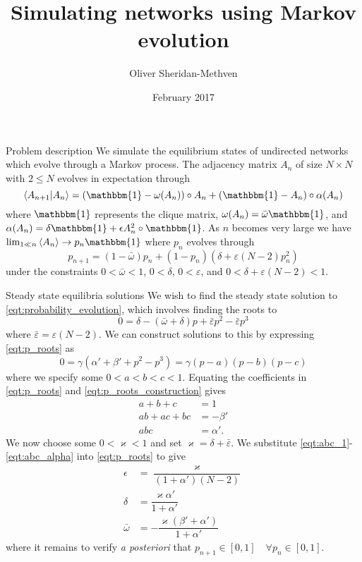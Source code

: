 \documentclass[8pt]{beamer}
\title{Simulating networks using Markov evolution}
\date{February 2017}
\author{Oliver Sheridan-Methven}
\newcommand{\clique}{\mathbbm{1}}
\begin{document}
\maketitle

\begin{frame}{Problem description}
	We simulate the equilibrium states of undirected networks which evolve through a Markov process. The adjacency matrix $ A_n $ of size $ N \times N $  with $ 2 \le N $ evolves in expectation through 
	\begin{equation}
	\bra{A_{n+1}}\ket{A_n} = \left(\clique - \omega(A_n) \right)\circ A_n + (\clique - A_n)\circ \alpha(A_n)
	\end{equation}
	where $ \clique $ represents the clique matrix, $ \omega(A_n) = \bar{\omega} \clique $, and $ \alpha(A_n) = \delta \clique + \epsilon A_n^2 \circ \clique $. As $ n $ becomes very large we have $ \lim_{1 \ll n} \expval{A_n}  \to p_n \clique $ where $ p_n $ evolves through
	\begin{equation}
	\label{eqt:probability_evolution}
	p_{n+1} = (1 - \bar{\omega})p_n + (1-p_n)(\delta + \varepsilon(N-2) p_n^2)
	\end{equation}
	under the constraints $ 0 < \bar{\omega} < 1 $, $ 0 < \delta $, $ 0 < \varepsilon $, and $ 0 < \delta + \varepsilon (N-2) < 1 $.
\end{frame}

\begin{frame}{Steady state equilibria solutions}
	We wish to find the steady state solution to \eqref{eqt:probability_evolution}, which involves finding the roots to 
	\begin{equation}
	\label{eqt:p_roots}
		0 = \delta - (\bar{\omega} + \delta)p + \bar{\varepsilon}p^2 -  \bar{\varepsilon}p^3
	\end{equation}
	where $ \bar{\varepsilon} =\varepsilon(N-2) $. We can construct solutions to this by expressing \eqref{eqt:p_roots} as 
	\begin{equation}
	\label{eqt:p_roots_construction}
	0 = \gamma (\alpha' + \beta' + p^2 - p^3) = \gamma (p - a)(p - b)(p - c)
	\end{equation}
	where we specify some $ 0< a< b< c< 1 $. Equating the coefficients in \eqref{eqt:p_roots} and \eqref{eqt:p_roots_construction} gives 
	\begin{align}
	a + b + c & = 1  \label{eqt:abc_1}\\
	ab + ac + bc & = -\beta' \label{eqt:abc_beta} \\
	abc & = \alpha' \label{eqt:abc_alpha}.
	\end{align}
	We now choose some $ 0< \varkappa < 1$ and set $ \varkappa = \delta + \bar{\varepsilon} $. We substitute \eqref{eqt:abc_1}-\eqref{eqt:abc_alpha} into \eqref{eqt:p_roots} to give
	\begin{align}
	\epsilon & = \dfrac{\varkappa}{(1 + \alpha')(N-2)} \\
	\delta & = \dfrac{\varkappa\alpha'}{1 + \alpha'} \\
	\bar{\omega} & = -\dfrac{\varkappa(\beta' + \alpha')}{1 + \alpha'}
	\end{align}
	where it remains to verify \emph{a posteriori} that $ p_{n+1} \in [0, 1] \quad \forall p_n \in [0, 1]$.
\end{frame}
\end{document}

